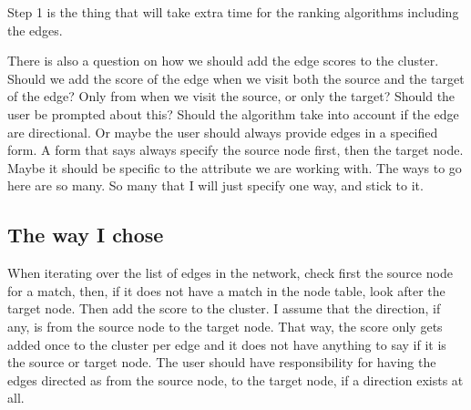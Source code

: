 Step 1 is the thing that will take extra time for the ranking algorithms
including the edges.

There is also a question on how we should add the edge scores to the cluster.
Should we add the score of the edge when we visit both the source and the target
of the edge? Only from when we visit the source, or only the target? Should the
user be prompted about this? Should the algorithm take into account if the edge
are directional. Or maybe the user should always provide edges in a specified
form. A form that says always specify the source node first, then the target
node. Maybe it should be specific to the attribute we are working with. The ways
to go here are so many. So many that I will just specify one way, and stick to
it. 

\subsection{The way I chose}
When iterating over the list of edges in the network, check first the source
node for a match, then, if it does not have a match in the node table, look
after the target node. Then add the score to the cluster. I assume that the
direction, if any, is from the source node to the target node. That way, the
score only gets added once to the cluster per edge and it does not have anything
to say if it is the source or target node. The user should have responsibility
for having the edges directed as from the source node, to the target node, if
a direction exists at all.



